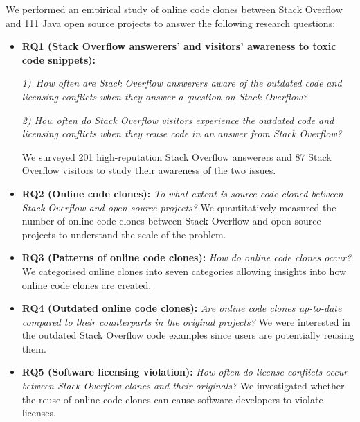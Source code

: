 \documentclass[10pt,journal,compsoc]{IEEEtran}
\begin{document}
We performed an empirical study of online code clones between Stack
Overflow and 111 Java open source projects to answer the following
research questions:
\begin{itemize}
	
	\item \textbf{RQ1 (Stack Overflow answerers' and visitors' awareness to toxic code snippets): }
	
	\textit{1)~How often are Stack Overflow
		answerers aware of the outdated code and licensing conflicts when
		they answer a question on Stack Overflow?} 
	
	\textit{2) How often do Stack Overflow
		visitors experience the outdated code and licensing conflicts when
		they reuse code in an answer from Stack Overflow?} 
	
	We surveyed 201 high-reputation Stack Overflow answerers and 87 Stack Overflow visitors to study their
	awareness of the two issues.

	\item \textbf{RQ2 (Online code clones): }\textit{To what extent is source
		code cloned between Stack Overflow and open source projects?} We
	quantitatively measured the number of online code clones between Stack
	Overflow and open source projects to understand the scale of the
	problem. 
	
	\item \textbf{RQ3 (Patterns of online code clones): }\textit{How do online
		code clones occur?} We categorised online clones into seven
	categories allowing insights into how online code clones are created.
	
	\item \textbf{RQ4 (Outdated online code clones): }\textit{Are
		online code clones up-to-date compared to their counterparts in the
		original projects?} We were interested in the outdated Stack
	Overflow code examples since users are potentially reusing
	them. 
	
	\item \textbf{RQ5 (Software licensing violation): }\textit{How often do
		license conflicts occur between Stack Overflow clones and their
		originals?} We investigated whether the reuse of online code clones
	can cause software developers to violate licenses.
\end{itemize}
\end{document}
